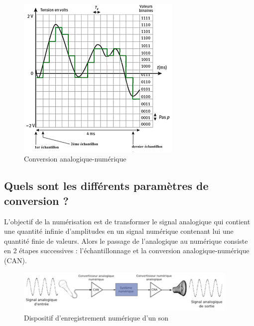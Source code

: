 \documentclass[a4paper]{article}
\begin{document}
\begin{figure}[H]
    \centering
    \includegraphics[width=0.70\textwidth]{images/conversion-AN.png}
    \caption{Conversion analogique-numérique}
    \label{fig:conversionANNA}
\end{figure}










\subsection{Quels sont les différents paramètres de conversion ?}





L’objectif de la numérisation est de transformer le signal analogique qui contient une quantité infinie d'amplitudes en un signal numérique contenant lui une quantité finie de valeurs. Alors le passage de l'analogique au numérique consiste en 2 étapes successives : l'échantillonnage et la conversion analogique-numérique (CAN).

\begin{figure}[H]
    \centering
    \includegraphics[width=0.95\textwidth]{images/parametres-conversion.PNG}
    \caption{Dispositif d'enregistrement numérique d'un son}
    \label{}
\end{figure}
\end{document}
